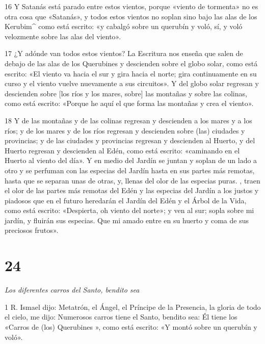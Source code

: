 \par 16 Y Satanás está parado entre estos vientos, porque «viento de tormenta» no es otra cosa que «Satanás», y todos estos vientos no soplan sino bajo las alas de los Kerubim^ como está escrito: «y cabalgó sobre un querubín y voló, sí, y voló velozmente sobre las alas del viento».

\par 17 ¿Y adónde van todos estos vientos? La Escritura nos enseña que salen de debajo de las alas de los Querubines y descienden sobre el globo solar, como está escrito: «El viento va hacia el sur y gira hacia el norte; gira continuamente en su curso y el viento vuelve nuevamente a sus circuitos». Y del globo solar regresan y descienden sobre [los ríos y los mares, sobre] las montañas y sobre las colinas, como está escrito: «Porque he aquí el que forma las montañas y crea el viento».

\par 18 Y de las montañas y de las colinas regresan y descienden a los mares y a los ríos; y de los mares y de los ríos regresan y descienden sobre (las) ciudades y provincias; y de las ciudades y provincias regresan y descienden al Huerto, y del Huerto regresan y descienden al Edén, como está escrito: «caminando en el Huerto al viento del día». Y en medio del Jardín se juntan y soplan de un lado a otro y se perfuman con las especias del Jardín hasta en sus partes más remotas, hasta que se separan unas de otras, y, llenas del olor de las especias puras. , traen el olor de las partes más remotas del Edén y las especias del Jardín a los justos y piadosos que en el futuro heredarán el Jardín del Edén y el Árbol de la Vida, como está escrito: «Despierta, oh viento del norte»; y ven al sur; sopla sobre mi jardín, y fluirán sus especias. Que mi amado entre en su huerto y coma de sus preciosos frutos».

\chapter{24}

\par \textit{Los diferentes carros del Santo, bendito sea}

\par 1 R. Ismael dijo: Metatrón, el Ángel, el Príncipe de la Presencia, la gloria de todo el cielo, me dijo: Numerosos carros tiene el Santo, bendito sea: Él tiene los «Carros de (los) Querubines », como está escrito: «Y montó sobre un querubín y voló».


